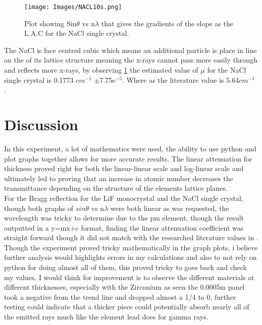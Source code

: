 \documentclass[12pt]{article}
\begin{document}
\begin{figure}[H]
\centering
\texttt{[image: Images/NACL10s.png]}
\caption{Plot showing Sin$\theta$ vs n$\lambda$ that gives the gradients of the slope as the L.A.C for the NaCl single crystal.}
\label{NaCl graph1}
\end{figure}

The NaCl is face centred cubic which means an additional particle is place in line on the of its lattice structure meaning the x-rays cannot pass more easily through and reflects more x-rays, by observing \cref{NaCl graph1} the estimated value of $\mu$ for the NaCl single crystal is 0.1773 $cm^{-1}$ $\pm$7.75e$^{-5}$. Where as the literature value is 5.64$cm^{-1}$ \cite{CRC}.

\section{Discussion}
\label{Disscussion Section}

In this experiment, a lot of mathematics were used, the ability to use python and plot graphs together allows for more accurate results. The linear attenuation for thickness proved right for both the linear-linear scale and log-linear scale and ultimately led to proving that an increase in atomic number decreases the transmittance depending on the structure of the elements lattice planes. \\

For the Bragg reflection for the LiF monocrystal and the NaCl single crystal, though both graphs of $sin\theta$ vs n$\lambda$ were both linear as was requested, the wavelength was tricky to determine due to the pm element, though the result outputted in a y=mx+c format, finding the linear attenuation coefficient was straight forward though it did not match with the researched literature values in \cite{CRC}. \\

Though the experiment proved tricky mathematically in the graph plots, i believe further analysis would highlights errors in my calculations and also to not rely on python for doing almost all of them, this proved tricky to goes back and check my values. I would think for improvement is to observe the different materials at different thicknesses, especially with the Zirconium as seen the 0.0005m panel took a negative from the trend line and dropped almost a 1/4 to 0, further testing could indicate that a thicker piece could potentially absorb nearly all of the emitted rays much like the element lead does for gamma rays.
\end{document}
